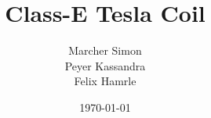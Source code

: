 \documentclass[
	fontsize=10pt, %
	twoside=false, %
	open=any, %
	numbers=noenddot, %
]{kaobook}
\begin{document}

\subject{Diploma Thesis}

\title{Class-E Tesla Coil}

\author{Marcher Simon\\Peyer Kassandra\\Felix Hamrle}

\date{\today}


\frontmatter %




\maketitle
{}





\begingroup %

\setlength{\textheight}{23cm} %
\end{document}
